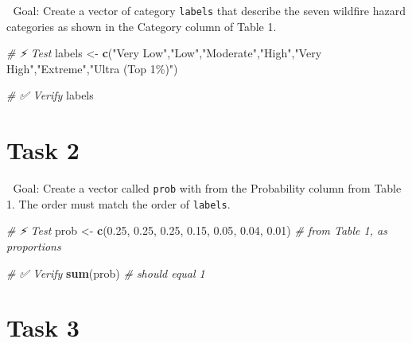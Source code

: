 \documentclass[
  12pt,
]{scrreprt}
\newenvironment{Shaded}{\begin{snugshade}}{\end{snugshade}}
\newcommand{\CommentTok}[1]{\textcolor[rgb]{0.56,0.35,0.01}{\textit{#1}}}
\newcommand{\FloatTok}[1]{\textcolor[rgb]{0.00,0.00,0.81}{#1}}
\newcommand{\FunctionTok}[1]{\textcolor[rgb]{0.13,0.29,0.53}{\textbf{#1}}}
\newcommand{\NormalTok}[1]{#1}
\newcommand{\OtherTok}[1]{\textcolor[rgb]{0.56,0.35,0.01}{#1}}
\newcommand{\StringTok}[1]{\textcolor[rgb]{0.31,0.60,0.02}{#1}}
\begin{document}
🎯 Goal: Create a vector of category \texttt{labels} that describe the seven wildfire hazard categories as shown in the Category column of Table 1.

\begin{Shaded}
\begin{Highlighting}[]
\CommentTok{\# ⚡ Test}
\NormalTok{labels  }\OtherTok{\textless{}{-}} \FunctionTok{c}\NormalTok{(}\StringTok{"Very Low"}\NormalTok{,}\StringTok{"Low"}\NormalTok{,}\StringTok{"Moderate"}\NormalTok{,}\StringTok{"High"}\NormalTok{,}\StringTok{"Very High"}\NormalTok{,}\StringTok{"Extreme"}\NormalTok{,}\StringTok{"Ultra (Top 1\%)"}\NormalTok{)}
\end{Highlighting}
\end{Shaded}

\begin{Shaded}
\begin{Highlighting}[]
\CommentTok{\# ✅  Verify}
\NormalTok{labels}
\end{Highlighting}
\end{Shaded}

\section{Task 2}\label{task-2-2}

🎯 Goal: Create a vector called \texttt{prob} with from the Probability column from Table 1. The order must match the order of \texttt{labels}.

\begin{Shaded}
\begin{Highlighting}[]
\CommentTok{\# ⚡ Test}
\NormalTok{prob    }\OtherTok{\textless{}{-}} \FunctionTok{c}\NormalTok{(}\FloatTok{0.25}\NormalTok{, }\FloatTok{0.25}\NormalTok{, }\FloatTok{0.25}\NormalTok{, }\FloatTok{0.15}\NormalTok{, }\FloatTok{0.05}\NormalTok{, }\FloatTok{0.04}\NormalTok{, }\FloatTok{0.01}\NormalTok{)   }\CommentTok{\# from Table 1, as proportions}
\end{Highlighting}
\end{Shaded}

\begin{Shaded}
\begin{Highlighting}[]
\CommentTok{\# ✅  Verify}
\FunctionTok{sum}\NormalTok{(prob)  }\CommentTok{\# should equal 1}
\end{Highlighting}
\end{Shaded}

\section{Task 3}\label{task-3-2}
\end{document}
